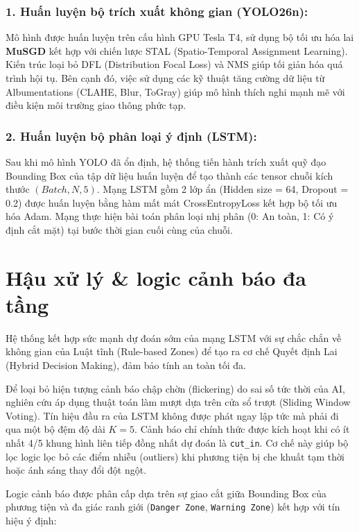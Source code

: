 	\subsubsection{1. Huấn luyện bộ trích xuất không gian (YOLO26n):}
	Mô hình được huấn luyện trên cấu hình GPU Tesla T4, sử dụng bộ tối ưu hóa lai \textbf{MuSGD} kết hợp với chiến lược STAL (Spatio-Temporal Assignment Learning). Kiến trúc loại bỏ DFL (Distribution Focal Loss) và NMS giúp tối giản hóa quá trình hội tụ. Bên cạnh đó, việc sử dụng các kỹ thuật tăng cường dữ liệu từ Albumentations (CLAHE, Blur, ToGray) giúp mô hình thích nghi mạnh mẽ với điều kiện môi trường giao thông phức tạp.
	
	\subsubsection{2. Huấn luyện bộ phân loại ý định (LSTM):}
	Sau khi mô hình YOLO đã ổn định, hệ thống tiến hành trích xuất quỹ đạo Bounding Box của tập dữ liệu huấn luyện để tạo thành các tensor chuỗi kích thước $(Batch, N, 5)$. Mạng LSTM gồm 2 lớp ẩn (Hidden size = 64, Dropout = 0.2) được huấn luyện bằng hàm mất mát CrossEntropyLoss kết hợp bộ tối ưu hóa Adam. Mạng thực hiện bài toán phân loại nhị phân (0: An toàn, 1: Có ý định cắt mặt) tại bước thời gian cuối cùng của chuỗi.
	
	\section{Hậu xử lý \& logic cảnh báo đa tầng}
	
	Hệ thống kết hợp sức mạnh dự đoán sớm của mạng LSTM với sự chắc chắn về không gian của Luật tĩnh (Rule-based Zones) để tạo ra cơ chế Quyết định Lai (Hybrid Decision Making), đảm bảo tính an toàn tối đa.

	Để loại bỏ hiện tượng cảnh báo chập chờn (flickering) do sai số tức thời của AI, nghiên cứu áp dụng thuật toán làm mượt dựa trên cửa sổ trượt (Sliding Window Voting). Tín hiệu đầu ra của LSTM không được phát ngay lập tức mà phải đi qua một bộ đệm độ dài $K=5$. Cảnh báo chỉ chính thức được kích hoạt khi có ít nhất 4/5 khung hình liên tiếp đồng nhất dự đoán là \texttt{cut\_in}. Cơ chế này giúp bộ lọc logic lọc bỏ các điểm nhiễu (outliers) khi phương tiện bị che khuất tạm thời hoặc ánh sáng thay đổi đột ngột.
	
	Logic cảnh báo được phân cấp dựa trên sự giao cắt giữa Bounding Box của phương tiện và đa giác ranh giới (\texttt{Danger Zone}, \texttt{Warning Zone}) kết hợp với tín hiệu ý định:
	

